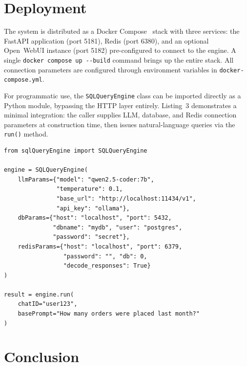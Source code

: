 \documentclass{article}
\begin{document}
\section{Deployment}
\label{sec:deployment}

The system is distributed as a Docker Compose~\citep{docker2013} stack with three services: the FastAPI application (port 5181), Redis (port 6380), and an optional Open~WebUI instance (port 5182) pre-configured to connect to the engine. A single \texttt{docker compose up -{}-build} command brings up the entire stack. All connection parameters are configured through environment variables in \texttt{docker-compose.yml}.

For programmatic use, the \texttt{SQLQueryEngine} class can be imported directly as a Python module, bypassing the HTTP layer entirely. Listing~3 demonstrates a minimal integration: the caller supplies LLM, database, and Redis connection parameters at construction time, then issues natural-language queries via the \texttt{run()} method.

\begin{lstlisting}[style=pythonstyle, caption={Using SQL Query Engine as a Python module.}]
from sqlQueryEngine import SQLQueryEngine

engine = SQLQueryEngine(
    llmParams={"model": "qwen2.5-coder:7b",
               "temperature": 0.1,
               "base_url": "http://localhost:11434/v1",
               "api_key": "ollama"},
    dbParams={"host": "localhost", "port": 5432,
              "dbname": "mydb", "user": "postgres",
              "password": "secret"},
    redisParams={"host": "localhost", "port": 6379,
                 "password": "", "db": 0,
                 "decode_responses": True}
)

result = engine.run(
    chatID="user123",
    basePrompt="How many orders were placed last month?"
)
\end{lstlisting}


\section{Conclusion}
\label{sec:conclusion}
\end{document}
